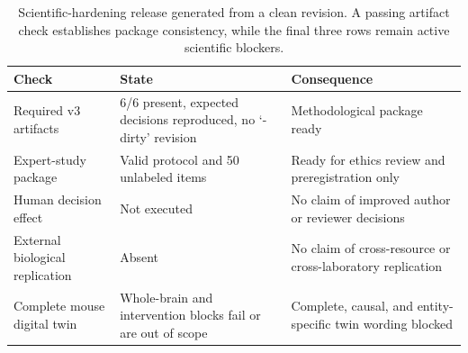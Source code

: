 \begin{table}[t!]
\centering
\caption{Scientific-hardening release generated from a clean revision. A
passing artifact check establishes package consistency, while the final three
rows remain active scientific blockers.}
\label{tab:release-summary}
\footnotesize
\renewcommand{\arraystretch}{1.12}
\begin{tabularx}{\textwidth}{@{}p{}p{}Y@{}}
\toprule
Check & State & Consequence \\
\midrule
Required v3 artifacts & 6/6 present, expected decisions reproduced, no `-dirty' revision & Methodological package ready \\
Expert-study package & Valid protocol and 50 unlabeled items & Ready for ethics review and preregistration only \\
Human decision effect & Not executed & No claim of improved author or reviewer decisions \\
External biological replication & Absent & No claim of cross-resource or cross-laboratory replication \\
Complete mouse digital twin & Whole-brain and intervention blocks fail or are out of scope & Complete, causal, and entity-specific twin wording blocked \\
\bottomrule
\end{tabularx}
\end{table}
